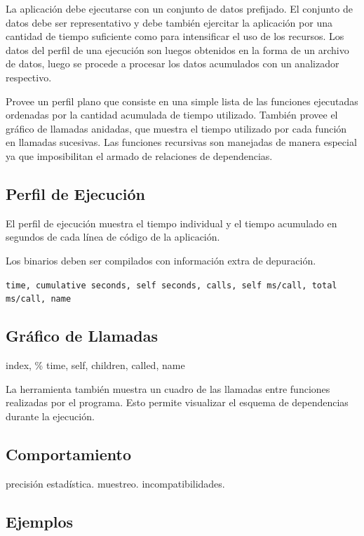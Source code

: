 \documentclass[a4paper]{report}
\begin{document}
La aplicaci\'on debe ejecutarse con un conjunto de datos prefijado. El conjunto de
datos debe ser representativo y debe tambi\'en ejercitar la aplicaci\'on por
una cantidad de tiempo suficiente como para intensificar el uso de los
recursos. Los datos del perfil de una ejecuci\'on son luegos obtenidos en la
forma de un archivo de datos, luego se procede a procesar los datos acumulados
con un analizador respectivo.

\bigskip

Provee un perfil plano que consiste en una simple lista de las funciones
ejecutadas ordenadas por la cantidad acumulada de tiempo utilizado.
Tambi\'en provee el gr\'afico de llamadas anidadas, que muestra el tiempo
utilizado por cada funci\'on en llamadas sucesivas. Las funciones recursivas
son manejadas de manera especial ya que imposibilitan el armado de relaciones
de dependencias.

\subsection{Perfil de Ejecuci\'on}

El perfil de ejecuci\'on muestra el tiempo individual y el tiempo acumulado en segundos
de cada l\'inea de c\'odigo de la aplicaci\'on.

Los binarios deben ser compilados con informaci\'on extra de depuraci\'on.

{\tt time, cumulative seconds, self seconds, calls, self ms/call,
  total ms/call, name}

\subsection{Gr\'afico de Llamadas}

index, \% time, self, children, called, name

La herramienta tambi\'en muestra un cuadro de las llamadas entre funciones realizadas por el programa.
Esto permite visualizar el esquema de dependencias durante la ejecuci\'on.

\subsection{Comportamiento}

precisi\'on estad\'istica. muestreo. incompatibilidades.

\subsection{Ejemplos}
\end{document}
